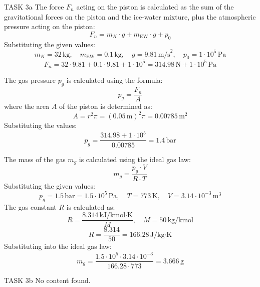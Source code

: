 TASK 3a  
The force \( F_n \) acting on the piston is calculated as the sum of the gravitational forces on the piston and the ice-water mixture, plus the atmospheric pressure acting on the piston:  
\[
F_n = m_K \cdot g + m_{\text{EW}} \cdot g + p_0
\]  
Substituting the given values:  
\[
m_K = 32 \, \text{kg}, \quad m_{\text{EW}} = 0.1 \, \text{kg}, \quad g = 9.81 \, \text{m/s}^2, \quad p_0 = 1 \cdot 10^5 \, \text{Pa}
\]  
\[
F_n = 32 \cdot 9.81 + 0.1 \cdot 9.81 + 1 \cdot 10^5 = 314.98 \, \text{N} + 1 \cdot 10^5 \, \text{Pa}
\]  

The gas pressure \( p_g \) is calculated using the formula:  
\[
p_g = \frac{F_n}{A}
\]  
where the area \( A \) of the piston is determined as:  
\[
A = r^2 \pi = (0.05 \, \text{m})^2 \pi = 0.00785 \, \text{m}^2
\]  
Substituting the values:  
\[
p_g = \frac{314.98 + 1 \cdot 10^5}{0.00785} = 1.4 \, \text{bar}
\]  

The mass of the gas \( m_g \) is calculated using the ideal gas law:  
\[
m_g = \frac{p_g \cdot V}{R \cdot T}
\]  
Substituting the given values:  
\[
p_g = 1.5 \, \text{bar} = 1.5 \cdot 10^5 \, \text{Pa}, \quad T = 773 \, \text{K}, \quad V = 3.14 \cdot 10^{-3} \, \text{m}^3
\]  
The gas constant \( R \) is calculated as:  
\[
R = \frac{8.314 \, \text{kJ/kmol·K}}{M}, \quad M = 50 \, \text{kg/kmol}
\]  
\[
R = \frac{8.314}{50} = 166.28 \, \text{J/kg·K}
\]  
Substituting into the ideal gas law:  
\[
m_g = \frac{1.5 \cdot 10^5 \cdot 3.14 \cdot 10^{-3}}{166.28 \cdot 773} = 3.666 \, \text{g}
\]  

TASK 3b  
No content found.